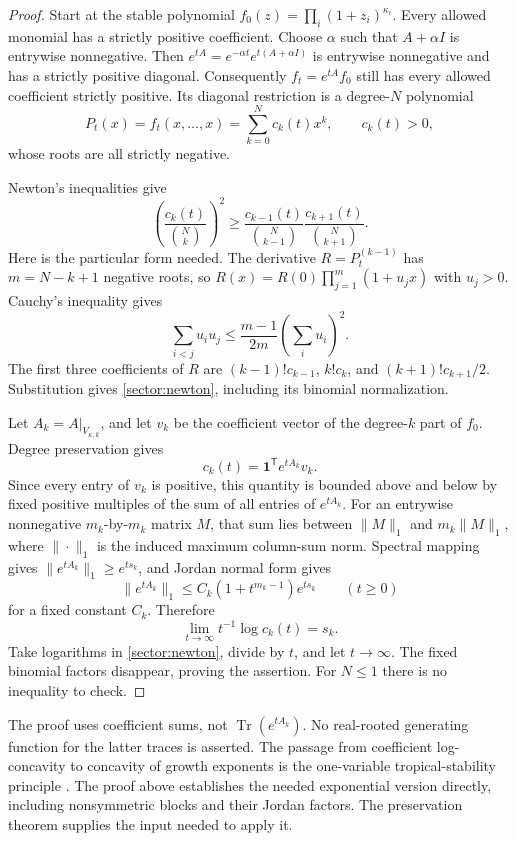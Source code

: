 \documentclass[reqno]{amsart}
\theoremstyle{definition}
\theoremstyle{remark}
\begin{document}
\begin{proof}
Start at the stable polynomial
\(f_0(z)=\prod_i(1+z_i)^{\kappa_i}\).
Every allowed monomial has a strictly positive coefficient.
Choose \(\alpha\) such that \(A+\alpha I\) is entrywise nonnegative.
Then \(e^{tA}=e^{-\alpha t}e^{t(A+\alpha I)}\) is entrywise
nonnegative and has a strictly positive diagonal. Consequently
\(f_t=e^{tA}f_0\) still has every allowed coefficient strictly positive.
Its diagonal restriction is a degree-\(N\) polynomial
\[
 P_t(x)=f_t(x,\ldots,x)=\sum_{k=0}^N c_k(t)x^k,
 \qquad c_k(t)>0,
\]
whose roots are all strictly negative.

Newton's inequalities give
\begin{equation}\label{sector:newton}
 \left(\frac{c_k(t)}{\binom Nk}\right)^2
 \ge
 \frac{c_{k-1}(t)}{\binom N{k-1}}
 \frac{c_{k+1}(t)}{\binom N{k+1}}.
\end{equation}
Here is the particular form needed. The derivative
\(R=P_t^{(k-1)}\) has \(m=N-k+1\) negative roots, so
\(R(x)=R(0)\prod_{j=1}^m(1+u_jx)\) with \(u_j>0\).
Cauchy's inequality gives
\[
 \sum_{i<j}u_iu_j
 \le\frac{m-1}{2m}\left(\sum_i u_i\right)^2.
\]
The first three coefficients of \(R\) are
\((k-1)!c_{k-1}\), \(k!c_k\), and
\((k+1)!c_{k+1}/2\). Substitution gives
\eqref{sector:newton}, including its binomial normalization.

Let \(A_k=A|_{V_{\kappa,k}}\), and let \(v_k\) be the coefficient
vector of the degree-\(k\) part of \(f_0\). Degree preservation gives
\[
 c_k(t)=\mathbf1^{\mathsf T}e^{tA_k}v_k.
\]
Since every entry of \(v_k\) is positive, this quantity is bounded
above and below by fixed positive multiples of the sum of all
entries of \(e^{tA_k}\). For an entrywise nonnegative \(m_k\)-by-\(m_k\)
matrix \(M\), that sum lies between \(\|M\|_1\) and
\(m_k\|M\|_1\), where \(\|\cdot\|_1\) is the induced maximum
column-sum norm. Spectral mapping gives
\(\|e^{tA_k}\|_1\ge e^{ts_k}\), and Jordan normal form gives
\[
 \|e^{tA_k}\|_1
 \le C_k(1+t^{m_k-1})e^{ts_k}\qquad(t\ge0)
\]
for a fixed constant \(C_k\). Therefore
\[
 \lim_{t\to\infty}t^{-1}\log c_k(t)=s_k.
\]
Take logarithms in \eqref{sector:newton}, divide by \(t\), and
let \(t\to\infty\). The fixed binomial factors disappear, proving
the assertion. For \(N\le1\) there is no inequality to check.
\end{proof}

The proof uses coefficient sums, not
\(\operatorname{Tr}(e^{tA_k})\). No real-rooted generating function
for the latter traces is asserted. The passage from coefficient
log-concavity to concavity of growth exponents is the one-variable
tropical-stability principle
\cite[Theorem~5 and the discussion following it]{Branden10Discrete}.
The proof above establishes the needed exponential version directly,
including nonsymmetric blocks and their Jordan factors.
The preservation theorem supplies the input needed to apply it.
\end{document}
